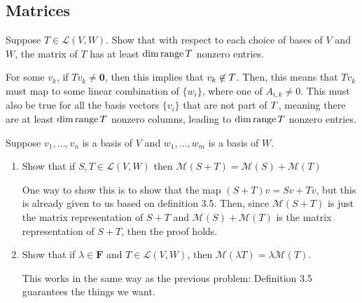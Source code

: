 \documentclass[10pt]{article}
\newcommand{\F}{\mathbf F}
\begin{document}
	\subsection{Matrices}

	\begin{problem}
		Suppose \( T \in \mathcal L(V, W) \). Show that with respect to each choice of bases of  \( V \) and \( W \), 
		the matrix of \( T \) has at least \( \dim \operatorname*{range} T \) nonzero entries. 
	\end{problem}

	\begin{solution}
		For some \( v_k \), if \( Tv_k \neq \mathbf 0 \), then this implies that \( v_k \not \in \null T \). Then, 
		this means that \( Tv_k \) must map to some linear combination of \( \{w_i\}  \), where one of 
		\( A_{i, k} \neq 0 \). This must also be true for all the basis vectors \( \{v_i\}  \) that 
		are not part of \( \null T \), meaning there are at least \( \dim \operatorname*{range} T \) nonzero columns, leading to 
		\( \dim \operatorname*{range} T \) nonzero entries. 
	\end{solution}

	
	\begin{problem}
		Suppose \( v_1, \dots, v_n \) is a basis of \( V \) and \( w_1, \dots, w_m \) is a basis of \( W \). 
		\begin{enumerate}[label=\alph*)]
			\item Show that if \( S, T \in \mathcal L(V, W) \) then 
				\( \mathcal M(S + T) = \mathcal M(S) + \mathcal M(T) \) 

				\begin{solution}
					One way to show this is to show that the map \( (S + T)v = Sv + Tv \), but this is already given 
					to us based on definition 3.5. Then, since \( \mathcal M(S + T) \) is just the matrix 
					representation of \( S + T \) and \( \mathcal M(S) + \mathcal M(T) \) is the matrix representation 
					of \( S + T \), then the proof holds. 
				\end{solution}
			\item Show that if \( \lambda \in \F \) and \( T \in \mathcal L(V, W) \), then \( \mathcal M(\lambda T)
				= \lambda \mathcal M(T)\). 

				\begin{solution}
					This works in the same way as the previous problem: Definition 3.5 guarantees the things we want. 
				\end{solution}
		\end{enumerate}
	\end{problem}
\end{document}
